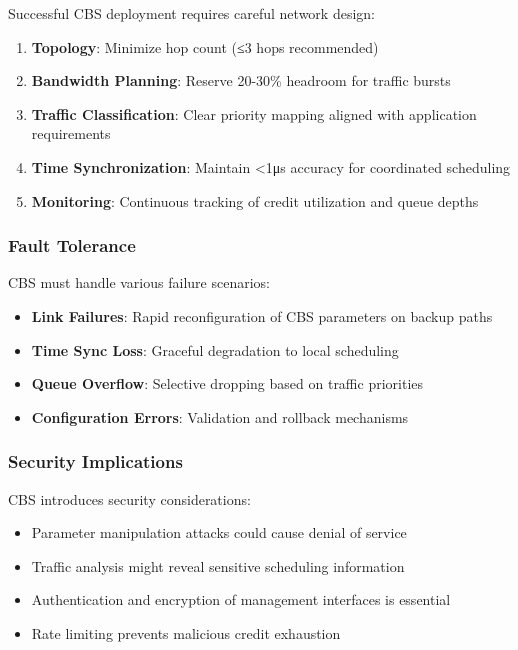 \documentclass[10pt, journal, compsoc]{IEEEtran}
\begin{document}
Successful CBS deployment requires careful network design:

\begin{enumerate}
    \item \textbf{Topology}: Minimize hop count (≤3 hops recommended)
    \item \textbf{Bandwidth Planning}: Reserve 20-30\% headroom for traffic bursts
    \item \textbf{Traffic Classification}: Clear priority mapping aligned with application requirements
    \item \textbf{Time Synchronization}: Maintain <1μs accuracy for coordinated scheduling
    \item \textbf{Monitoring}: Continuous tracking of credit utilization and queue depths
\end{enumerate}

\subsubsection{Fault Tolerance}

CBS must handle various failure scenarios:

\begin{itemize}
    \item \textbf{Link Failures}: Rapid reconfiguration of CBS parameters on backup paths
    \item \textbf{Time Sync Loss}: Graceful degradation to local scheduling
    \item \textbf{Queue Overflow}: Selective dropping based on traffic priorities
    \item \textbf{Configuration Errors}: Validation and rollback mechanisms
\end{itemize}

\subsubsection{Security Implications}

CBS introduces security considerations:

\begin{itemize}
    \item Parameter manipulation attacks could cause denial of service
    \item Traffic analysis might reveal sensitive scheduling information
    \item Authentication and encryption of management interfaces is essential
    \item Rate limiting prevents malicious credit exhaustion
\end{itemize}
\end{document}
